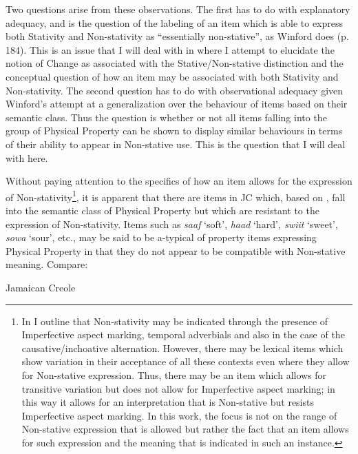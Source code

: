 Two questions arise from these observations.  The first has to do with
explanatory adequacy, and is the question of the labeling of an item
which is able to express both Stativity and Non-stativity as
“essentially non-stative”, as Winford does (p. 184).  This is an issue
that I will deal with in  where I attempt to elucidate the
notion of Change as associated with the Stative\slash Non-stative
distinction and the conceptual question of how an item may be
associated with both Stativity and Non-stativity.  The second question
has to do with observational adequacy given Winford’s attempt at a
generalization over the behaviour of items based on their semantic
class.  Thus the question is whether or not all items falling into the
group of Physical Property can be shown to display similar behaviours
in terms of their ability to appear in Non-stative use.  This is the
question that I will deal with here.

Without paying attention to the specifics of how an item allows for
the expression of Non-stativity\footnote{In  I outline
  that Non-stativity may be indicated through the presence of
  Imperfective aspect marking, temporal adverbials and also in the
  case of the causative\slash inchoative alternation. However, there may be
  lexical items which show variation in their acceptance of all these
  contexts even where they allow for Non-stative expression. Thus,
  there may be an item which allows for transitive variation but does
  not allow for Imperfective aspect marking; in this way it allows for
  an interpretation that is Non-stative but resists Imperfective
  aspect marking. In this work, the focus is not on the range of
  Non-stative expression that is allowed but rather the fact that an
  item allows for such expression and the meaning that is indicated in
  such an instance.}, it is apparent that there are items in JC which,
based on \citet{Winford1993}, fall into the semantic class of Physical
Property but which are resistant to the expression of Non-stativity.
Items such as \textit{saaf} `soft', \textit{haad} `hard'\textit{,
  swiit} `sweet', \textit{sowa} `sour', etc., may be said to be
a-typical of property items expressing Physical Property in that they
do not appear to be compatible with Non-stative meaning.  Compare:

\ea%
\label{ex:3:18}
Jamaican Creole \\

